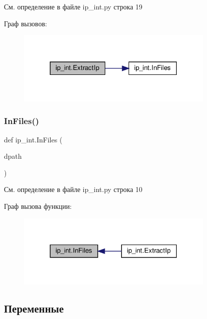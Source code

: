 См. определение в файле ip\+\_\+int.\+py строка 19

Граф вызовов\+:
\nopagebreak
\begin{figure}[H]
\begin{center}
\leavevmode
\includegraphics[width=271pt]{namespaceip__int_a1a05578cb2ec5018f5e481627c649bc7_cgraph}
\end{center}
\end{figure}
\mbox{\label{namespaceip__int_ac9607d62086cdc4c5631927e26da01d0}} 
\subsubsection{\texorpdfstring{In\+Files()}{InFiles()}}
{\footnotesize\ttfamily def ip\+\_\+int.\+In\+Files (\begin{DoxyParamCaption}\item[{}]{dpath }\end{DoxyParamCaption})}



См. определение в файле ip\+\_\+int.\+py строка 10

Граф вызова функции\+:
\nopagebreak
\begin{figure}[H]
\begin{center}
\leavevmode
\includegraphics[width=271pt]{namespaceip__int_ac9607d62086cdc4c5631927e26da01d0_icgraph}
\end{center}
\end{figure}


\subsection{Переменные}
\mbox{\label{namespaceip__int_a079503e2cdbf08bcbe0c81679a240fa7}} 

